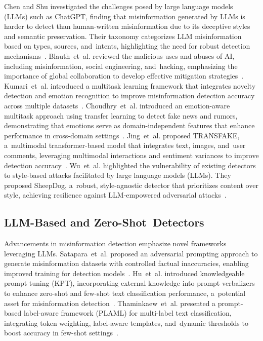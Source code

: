 \documentclass[electronics,article,accept,pdftex,moreauthors,electronics]{Definitions/mdpi}
\begin{document}
Chen and Shu investigated the challenges posed by large language models (LLMs) such as ChatGPT, finding that misinformation generated by LLMs is harder to detect than human-written misinformation due to its deceptive styles and semantic preservation. Their taxonomy categorizes LLM misinformation based on types, sources, and~intents, highlighting the need for robust detection mechanisms~\cite{chen_can_2024}. Blauth~et~al. reviewed the malicious uses and abuses of AI, including misinformation, social engineering, and~hacking, emphasizing the importance of global collaboration to develop effective mitigation strategies~\cite{blauth_artificial_2022}. Kumari~et~al. introduced a multitask learning framework that integrates novelty detection and emotion recognition to improve misinformation detection accuracy across multiple datasets~\cite{kumari_multitask_2021}. Choudhry~et~al. introduced an emotion-aware multitask approach using transfer learning to detect fake news and rumors, demonstrating that emotions serve as domain-independent features that enhance performance in cross-domain settings~\cite{choudhry_emotion-aware_2024}. Jing~et~al. proposed TRANSFAKE, a~multimodal transformer-based model that integrates text, images, and~user comments, leveraging multimodal interactions and sentiment variances to improve detection accuracy~\cite{jing_transfake_2021}. Wu~et~al. highlighted the vulnerability of existing detectors to style-based attacks facilitated by large language models (LLMs). They proposed SheepDog, a~robust, style-agnostic detector that prioritizes content over style, achieving resilience against LLM-empowered adversarial attacks~\cite{wu_fake_2024}.

\subsection{LLM-Based and Zero-Shot~Detectors}

Advancements in misinformation detection emphasize novel frameworks leveraging LLMs. Satapara~et~al. proposed an adversarial prompting approach to generate misinformation datasets with controlled factual inaccuracies, enabling improved training for detection models~\cite{satapara_fighting_2024}. Hu~et~al. introduced knowledgeable prompt tuning (KPT), incorporating external knowledge into prompt verbalizers to enhance zero-shot and few-shot text classification performance, a~potential asset for misinformation detection~\cite{hu_knowledgeable_2022}. Thaminkaew~et~al. presented a prompt-based label-aware framework (PLAML) for multi-label text classification, integrating token weighting, label-aware templates, and~dynamic thresholds to boost accuracy in few-shot settings~\cite{thaminkaew_prompt-based_2024}.
\end{document}
